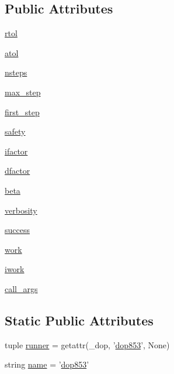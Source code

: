 \subsection*{Public Attributes}
\begin{DoxyCompactItemize}
\item 
\hyperlink{classscipy_1_1integrate_1_1__ode_1_1dop853_af4e3161ed38d8a999fe3f0de771e15d6}{rtol}
\item 
\hyperlink{classscipy_1_1integrate_1_1__ode_1_1dop853_a36c6a68a32f3f6caa63bdd46b7d645b2}{atol}
\item 
\hyperlink{classscipy_1_1integrate_1_1__ode_1_1dop853_aa86a6cd6871c3fc1222bac6afcea9b70}{nsteps}
\item 
\hyperlink{classscipy_1_1integrate_1_1__ode_1_1dop853_afa0d491ce98cacfc6218f79394d18bf8}{max\+\_\+step}
\item 
\hyperlink{classscipy_1_1integrate_1_1__ode_1_1dop853_a7c4d0fa361f4f0bd6aa8ff9bd3a9e3a9}{first\+\_\+step}
\item 
\hyperlink{classscipy_1_1integrate_1_1__ode_1_1dop853_ae2cf55a351b8d2c7c03f2685bb1ec092}{safety}
\item 
\hyperlink{classscipy_1_1integrate_1_1__ode_1_1dop853_a2bda08bc62695d45c805911c253c4816}{ifactor}
\item 
\hyperlink{classscipy_1_1integrate_1_1__ode_1_1dop853_a152c9217fc6ade43a83d3cd1ae88be42}{dfactor}
\item 
\hyperlink{classscipy_1_1integrate_1_1__ode_1_1dop853_ae0bbebf0f049c50e3f118c7fb265bc26}{beta}
\item 
\hyperlink{classscipy_1_1integrate_1_1__ode_1_1dop853_a3fcf9b6a7aacbf8f7eab141f3768ea31}{verbosity}
\item 
\hyperlink{classscipy_1_1integrate_1_1__ode_1_1dop853_a089bf5b80134e66fd510ccdcb9a8dd40}{success}
\item 
\hyperlink{classscipy_1_1integrate_1_1__ode_1_1dop853_abe9c63f94f7068946a91d4a8c243e220}{work}
\item 
\hyperlink{classscipy_1_1integrate_1_1__ode_1_1dop853_a4eaa49d0d5ee9500832d19e88725b786}{iwork}
\item 
\hyperlink{classscipy_1_1integrate_1_1__ode_1_1dop853_a319570e063fa0fa25f9b4737203ca366}{call\+\_\+args}
\end{DoxyCompactItemize}
\subsection*{Static Public Attributes}
\begin{DoxyCompactItemize}
\item 
tuple \hyperlink{classscipy_1_1integrate_1_1__ode_1_1dop853_ad4edcd655f488c03d688a3157f3d46d1}{runner} = getattr(\+\_\+dop, '\hyperlink{classscipy_1_1integrate_1_1__ode_1_1dop853}{dop853}', None)
\item 
string \hyperlink{classscipy_1_1integrate_1_1__ode_1_1dop853_a9bf50bae7c982ded2837c14fe7c6e9a0}{name} = '\hyperlink{classscipy_1_1integrate_1_1__ode_1_1dop853}{dop853}'
\end{DoxyCompactItemize}


